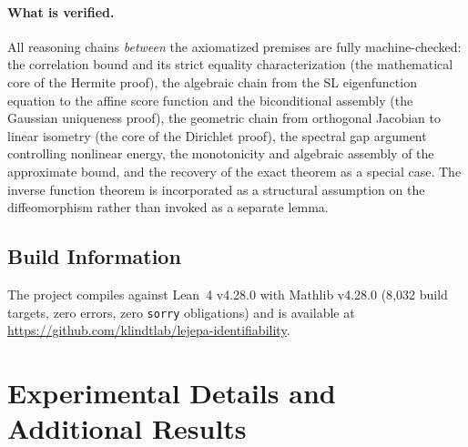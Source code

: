 \paragraph{What is verified.}
All reasoning chains \emph{between} the axiomatized premises are fully machine-checked: the correlation bound and its strict equality characterization (the mathematical core of the Hermite proof), the algebraic chain from the SL eigenfunction equation to the affine score function and the biconditional assembly (the Gaussian uniqueness proof), the geometric chain from orthogonal Jacobian to linear isometry (the core of the Dirichlet proof), the spectral gap argument controlling nonlinear energy, the monotonicity and algebraic assembly of the approximate bound, and the recovery of the exact theorem as a special case. The inverse function theorem is incorporated as a structural assumption on the diffeomorphism rather than invoked as a separate lemma.

\subsection{Build Information}
The project compiles against Lean~4 v4.28.0 with Mathlib v4.28.0 (8{,}032 build targets, zero errors, zero \texttt{sorry} obligations) and is available at \url{https://github.com/klindtlab/lejepa-identifiability}.




\section{Experimental Details and Additional Results}\label{app:experiment}

